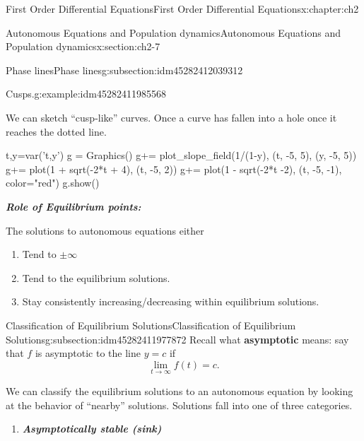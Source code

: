 \documentclass[oneside,10pt,]{book}
\newcommand{\alert}[1]{\textbf{\textit{#1}}}
\newcommand{\terminology}[1]{\textbf{#1}}
\numberwithin{equation}{section}
\numberwithin{equation}{section}
\begin{document}
\begin{chapterptx}{First Order Differential Equations}{}{First Order Differential Equations}{}{}{x:chapter:ch2}
\begin{sectionptx}{Autonomous Equations and Population dynamics}{}{Autonomous Equations and Population dynamics}{}{}{x:section:ch2-7}
\begin{subsectionptx}{Phase lines}{}{Phase lines}{}{}{g:subsection:idm45282412039312}
\begin{example}{Cusps.}{g:example:idm45282411985568}
\begin{image}{0}{1}{0}
\end{image}%
 We can sketch ``cusp-like'' curves. Once a curve has fallen into a hole once it reaches the dotted line.%
\begin{sageinput}
t,y=var('t,y')
g = Graphics()
g+= plot_slope_field(1/(1-y), (t, -5, 5), (y, -5, 5))
g+= plot(1 + sqrt(-2*t + 4), (t, -5, 2))
g+= plot(1 - sqrt(-2*t -2), (t, -5, -1), color="red")
g.show()
\end{sageinput}
\end{example}
\alert{Role of Equilibrium points:}%
\par
The solutions to autonomous equations either%
\begin{enumerate}
\item{}Tend to \(\pm\infty\)%
\item{}Tend to the equilibrium solutions.%
\item{}Stay consistently increasing\slash{}decreasing within equilibrium solutions.%
\end{enumerate}
%
\end{subsectionptx}
%
%
\typeout{************************************************}
\typeout{************************************************}
%
\begin{subsectionptx}{Classification of Equilibrium Solutions}{}{Classification of Equilibrium Solutions}{}{}{g:subsection:idm45282411977872}
Recall what \terminology{asymptotic} means: say that \(f\) is asymptotic to the line \(y = c\) if%
\begin{equation*}
\lim_{t \to \infty} f(t) = c.
\end{equation*}
%
\par
We can classify the equilibrium solutions to an autonomous equation by looking at the behavior of ``nearby'' solutions. Solutions fall into one of three categories.%
%
\begin{enumerate}
\item{}\alert{Asymptotically stable (sink)}%
%
\end{enumerate}
\end{subsectionptx}
\end{sectionptx}
\end{chapterptx}
\end{document}
